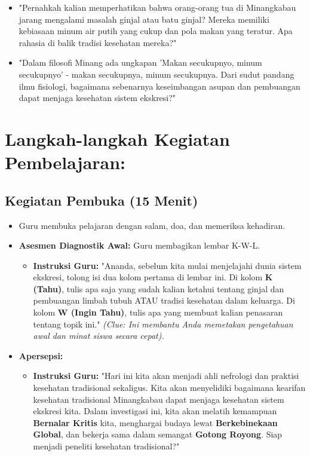 \documentclass[a4paper,12pt]{article}
\begin{document}
\begin{itemize}
\item "Pernahkah kalian memperhatikan bahwa orang-orang tua di Minangkabau jarang mengalami masalah ginjal atau batu ginjal? Mereka memiliki kebiasaan minum air putih yang cukup dan pola makan yang teratur. Apa rahasia di balik tradisi kesehatan mereka?"
\item "Dalam filosofi Minang ada ungkapan 'Makan secukupnyo, minum secukupnyo' - makan secukupnya, minum secukupnya. Dari sudut pandang ilmu fisiologi, bagaimana sebenarnya keseimbangan asupan dan pembuangan dapat menjaga kesehatan sistem ekskresi?"
\end{itemize}

\section{Langkah-langkah Kegiatan Pembelajaran:}

\subsection{Kegiatan Pembuka (15 Menit)}
\begin{itemize}
\item Guru membuka pelajaran dengan salam, doa, dan memeriksa kehadiran.
\item \textbf{Asesmen Diagnostik Awal:} Guru membagikan lembar K-W-L.
    \begin{itemize}
    \item \textbf{Instruksi Guru:} "Ananda, sebelum kita mulai menjelajahi dunia sistem ekskresi, tolong isi dua kolom pertama di lembar ini. Di kolom \textbf{K (Tahu)}, tulis apa saja yang sudah kalian ketahui tentang ginjal dan pembuangan limbah tubuh ATAU tradisi kesehatan dalam keluarga. Di kolom \textbf{W (Ingin Tahu)}, tulis apa yang membuat kalian penasaran tentang topik ini." \textit{(Clue: Ini membantu Anda memetakan pengetahuan awal dan minat siswa secara cepat).}
    \end{itemize}
\item \textbf{Apersepsi:}
    \begin{itemize}
    \item \textbf{Instruksi Guru:} "Hari ini kita akan menjadi ahli nefrologi dan praktisi kesehatan tradisional sekaligus. Kita akan menyelidiki bagaimana kearifan kesehatan tradisional Minangkabau dapat menjaga kesehatan sistem ekskresi kita. Dalam investigasi ini, kita akan melatih kemampuan \textbf{Bernalar Kritis} kita, menghargai budaya lewat \textbf{Berkebinekaan Global}, dan bekerja sama dalam semangat \textbf{Gotong Royong}. Siap menjadi peneliti kesehatan tradisional?"
    \end{itemize}
\end{itemize}
\end{document}
